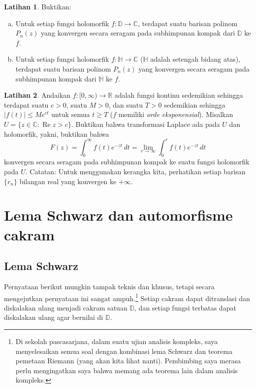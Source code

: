 \documentclass[12pt,openany]{book}
\renewcommand{\Re}{\operatorname{Re}}
\newcommand{\sabs}[1]{\lvert {#1} \rvert}
\newcommand{\C}{{\mathbb{C}}}
\newcommand{\R}{{\mathbb{R}}}
\newcommand{\D}{{\mathbb{D}}}
\newcommand{\bH}{{\mathbb{H}}}
\newcommand{\myindex}[1]{#1\index{#1}}
\theoremstyle{plain}
\theoremstyle{remark}
\theoremstyle{definition}
\newenvironment{exbox}{%
    \def\FrameCommand{\vrule width 1pt \relax\hspace{10pt}}%
    \MakeFramed{\advance\hsize-\width\FrameRestore}%
}{%
    \endMakeFramed
}
\newenvironment{exparts}{%
    \leavevmode\begin{enumerate}[a),noitemsep,topsep=0pt,parsep=0pt,partopsep=0pt]
}{%
    \end{enumerate}
}
\theoremstyle{exercise}
\newtheorem{exercise}{Latihan}[section]
\theoremstyle{example}
\begin{document}
\begin{exbox}
\begin{exercise}\label{exercise:polylimits}
\pagebreak[2]
Buktikan:
\begin{exparts}
\item
Untuk setiap fungsi holomorfik $f \colon \D \to \C$, terdapat
suatu barisan polinom $P_n(z)$ yang konvergen secara seragam pada subhimpunan
kompak dari $\D$ ke $f$.
\item
Untuk setiap fungsi holomorfik $f \colon \bH \to \C$
($\bH$ adalah setengah bidang atas), terdapat
suatu barisan polinom $P_n(z)$ yang konvergen secara seragam pada subhimpunan
kompak dari $\bH$ ke $f$.
\end{exparts}
\end{exercise}

\begin{exercise}
\pagebreak[2]
Andaikan $f \colon [0,\infty) \to \R$ adalah fungsi kontinu sedemikian sehingga
terdapat suatu $c > 0$, suatu $M > 0$, dan suatu $T > 0$ sedemikian sehingga 
$\sabs{f(t)} \leq M e^{ct}$ untuk semua $t \geq T$
($f$ memiliki \emph{\myindex{orde eksponensial}}).
Misalkan $U = \{ z \in \C : \Re z > c \}$.  Buktikan bahwa transformasi Laplace
ada pada $U$ dan holomorfik, yakni, buktikan bahwa
\begin{equation*}
F(z) = \int_0^\infty f(t) e^{-zt} \, dt = \lim_{r \to \infty} \int_0^r f(t)
e^{-zt} \, dt
\end{equation*}
konvergen secara seragam pada subhimpunan kompak ke suatu fungsi holomorfik pada $U$.
Catatan: Untuk menggunakan kerangka kita, perhatikan setiap barisan $\{ r_n \}$
bilangan real yang konvergen ke $+\infty$.
\end{exercise}
\end{exbox}


\section{Lema Schwarz dan automorfisme cakram}
\label{sec:schwarz}

\subsection{Lema Schwarz}

Pernyataan berikut mungkin
tampak teknis dan khusus, tetapi secara mengejutkan pernyataan ini sangat
ampuh.\footnote{Di sekolah pascasarjana, dalam suatu ujian analisis
kompleks, saya menyelesaikan semua soal dengan kombinasi
lema Schwarz dan teorema pemetaan
Riemann (yang akan kita lihat nanti).
Pembimbing saya
merasa perlu mengingatkan saya bahwa memang ada teorema lain dalam analisis
kompleks.}
Setiap cakram dapat ditranslasi dan diskalakan ulang menjadi cakram satuan $\D$, dan setiap
fungsi terbatas dapat diskalakan ulang agar bernilai di $\D$.
\end{document}
